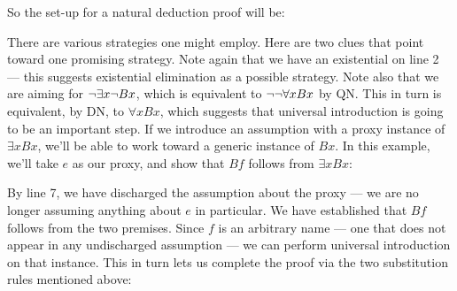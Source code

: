 So the set-up for a natural deduction proof will be:

\begin{ndproof}
	 
	\have{}{}{}
\end{ndproof}

There are various strategies one might employ. Here are two clues that point toward one promising strategy. Note again that we have an existential on line 2 --- this suggests existential elimination as a possible strategy. Note also that we are aiming for $\neg \exists x \neg Bx$, which is equivalent to $\neg \neg \forall x Bx$ by QN. This in turn is equivalent, by DN, to $\forall x Bx$, which suggests that universal introduction is going to be an important step. If we introduce an assumption with a proxy instance of $\exists x Bx$, we'll be able to work toward a generic instance of $Bx$. In this example, we'll take $e$ as our proxy, and show that $Bf$ follows from $\exists x Bx$:

\begin{ndproof}
	 
	\open
	\close
\end{ndproof}

By line 7, we have discharged the assumption about the proxy --- we are no longer assuming anything about $e$ in particular. We have established that $Bf$ follows from the two premises. Since $f$ is an arbitrary name --- one that does not appear in any undischarged assumption --- we can perform universal introduction on that instance. This in turn lets us complete the proof via the two substitution rules mentioned above:

\begin{ndproof}
	 
	\open
	\close
\end{ndproof}




